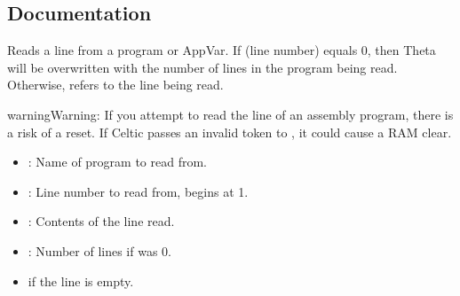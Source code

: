 \documentclass[letterpaper,10pt,english]{sphinxmanual}
\begin{document}
\subsection{Documentation}
\label{\detokenize{csefunctions:documentation}}\begin{description}
\sphinxAtStartPar
Reads a line from a program or AppVar. If  (line number) equals 0, then Theta will be overwritten with the number of lines in the program being read. Otherwise,  refers to the line being read.

\begin{sphinxadmonition}{warning}{Warning:}
\sphinxAtStartPar
If you attempt to read the line of an assembly program, there is a risk of a reset. If Celtic passes an invalid token to , it could cause a RAM clear.
\end{sphinxadmonition}
\begin{description}
\begin{itemize}
\item {} 
\sphinxAtStartPar
{}: Name of program to read from.

\item {} 
\sphinxAtStartPar
{}: Line number to read from, begins at 1.

\end{itemize}

\begin{itemize}
\item {} 
\sphinxAtStartPar
{}: Contents of the line read.

\item {} 
\sphinxAtStartPar
{}: Number of lines if  was 0.

\end{itemize}

\begin{itemize}
\item {} 
\sphinxAtStartPar
{} if the line is empty.

\end{itemize}


\end{description}
\end{description}
\end{document}
